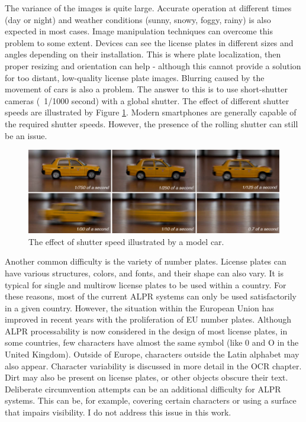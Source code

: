 The variance of the images is quite large. Accurate operation at different times (day or night) and weather conditions (sunny, snowy, foggy, rainy) is also expected in most cases. Image manipulation techniques can overcome this problem to some extent. Devices can see the license plates in different sizes and angles depending on their installation. This is where plate localization, then proper resizing and orientation can help - although this cannot provide a solution for too distant, low-quality license plate images. Blurring caused by the movement of cars is also a problem. The answer to this is to use short-shutter cameras (~1/1000 second) with a global shutter. The effect of different shutter speeds are illustrated by Figure \ref{fig:shutter-speed}. Modern smartphones are generally capable of the required shutter speeds. However, the presence of the rolling shutter can still be an issue.

\begin{figure}[htb]
 \centerline{\includegraphics[width=1.0\columnwidth]{.//Figure/ALPR/shutter-speed.png}}
 \caption{The effect of shutter speed illustrated by a model car\cite{ShutterEffect}.}
 \label{fig:shutter-speed}
\end{figure}

Another common difficulty is the variety of number plates. License plates can have various structures, colors, and fonts, and their shape can also vary. It is typical for single and multirow license plates to be used within a country. For these reasons, most of the current ALPR systems can only be used satisfactorily in a given country. However, the situation within the European Union has improved in recent years with the proliferation of EU number plates. Although ALPR processability is now considered in the design of most license plates, in some countries, few characters have almost the same symbol (like 0 and O in the United Kingdom). Outside of Europe, characters outside the Latin alphabet may also appear. Character variability is discussed in more detail in the OCR chapter. Dirt may also be present on license plates, or other objects obscure their text. Deliberate circumvention attempts can be an additional difficulty for ALPR systems. This can be, for example, covering certain characters or using a surface that impairs visibility. I do not address this issue in this work.
\newpage

